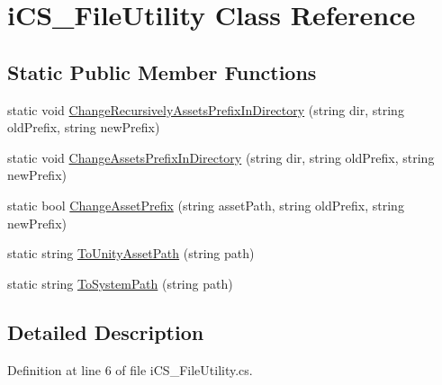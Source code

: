 \hypertarget{classi_c_s___file_utility}{\section{i\+C\+S\+\_\+\+File\+Utility Class Reference}
\label{classi_c_s___file_utility}
}
\subsection*{Static Public Member Functions}
\begin{DoxyCompactItemize}
\item 
static void \hyperlink{classi_c_s___file_utility_a505642e1d5d4a641192b502aec7a60e6}{Change\+Recursively\+Assets\+Prefix\+In\+Directory} (string dir, string old\+Prefix, string new\+Prefix)
\item 
static void \hyperlink{classi_c_s___file_utility_a9eb7ad85c278a741436ed92a864d7d51}{Change\+Assets\+Prefix\+In\+Directory} (string dir, string old\+Prefix, string new\+Prefix)
\item 
static bool \hyperlink{classi_c_s___file_utility_a69a7020638c632fbc77ef771053566aa}{Change\+Asset\+Prefix} (string asset\+Path, string old\+Prefix, string new\+Prefix)
\item 
static string \hyperlink{classi_c_s___file_utility_afdcc0888116e3fedab583342d6a3647d}{To\+Unity\+Asset\+Path} (string path)
\item 
static string \hyperlink{classi_c_s___file_utility_ac417cf8b8d2d80e033f410907d49befc}{To\+System\+Path} (string path)
\end{DoxyCompactItemize}


\subsection{Detailed Description}


Definition at line 6 of file i\+C\+S\+\_\+\+File\+Utility.\+cs.



